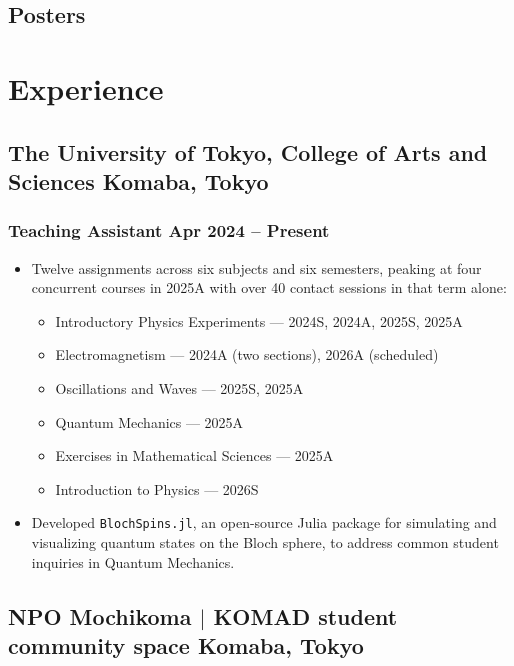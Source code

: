\documentclass[11pt]{article} %
\begin{document}
\subsection{Posters}
\begin{enumerate}[resume=cvrefs, label={[\arabic*]}, left=0pt..\parindent, itemsep=2pt]
	\item {}
	\item {}
\end{enumerate}

\section{Experience}
\subsection{The University of Tokyo, College of Arts and Sciences \hfill Komaba, Tokyo}
\subsubsection{Teaching Assistant \hfill Apr 2024 -- Present}
\begin{itemize}
	\item Twelve assignments across six subjects and six semesters, peaking at four concurrent courses in 2025A with over 40 contact sessions in that term alone:
	\begin{itemize}
		\item Introductory Physics Experiments --- 2024S, 2024A, 2025S, 2025A
		\item Electromagnetism --- 2024A (two sections), 2026A (scheduled)
		\item Oscillations and Waves --- 2025S, 2025A
		\item Quantum Mechanics --- 2025A
		\item Exercises in Mathematical Sciences --- 2025A
		\item Introduction to Physics --- 2026S
	\end{itemize}
	\item Developed \texttt{BlochSpins.jl}, an open-source Julia package for simulating and visualizing quantum states on the Bloch sphere, to address common student inquiries in Quantum Mechanics.
\end{itemize}

\subsection{NPO Mochikoma $|$ KOMAD student community space \hfill Komaba, Tokyo}
\end{document}
